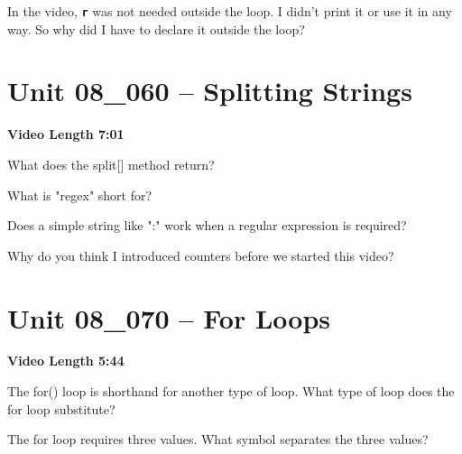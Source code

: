 \documentclass[letterpaper,12pt]{exam}
\newcommand{\unit}{Unit 08}
\begin{document}
\begin{questions}
\begin{samepage}
    \question In the video, \texttt{\textbf{r}} was not needed outside the loop.  I didn't print it or use it in any way.  So why did I have to declare it outside the loop?
    \vspace{5mm}
\end{samepage}



\section*{\unit\_060 -- Splitting Strings} %
\par{\selectfont\textbf{Video Length 7:01}}

\begin{samepage}
    \question What does the split[] method return?
    \vspace{5mm}
\end{samepage}

\begin{samepage}
    \question What is "regex" short for?
    \vspace{5mm}
\end{samepage}

\begin{samepage}
    \question Does a simple string like ":" work when a regular expression is required?
    \vspace{5mm}
\end{samepage}

\begin{samepage}
    \question Why do you think I introduced counters before we started this video?
    \vspace{5mm}
\end{samepage}

\section*{\unit\_070 -- For Loops} %
\par{\selectfont\textbf{Video Length 5:44}}

\begin{samepage}
    \question The for() loop is shorthand for another type of loop.  What type of loop does the for loop substitute?
    \vspace{5mm}
\end{samepage}
\begin{samepage}
    \question The for loop requires three values.  What symbol separates the three values?
    \vspace{5mm}
\end{samepage}


\end{questions}
\end{document}
